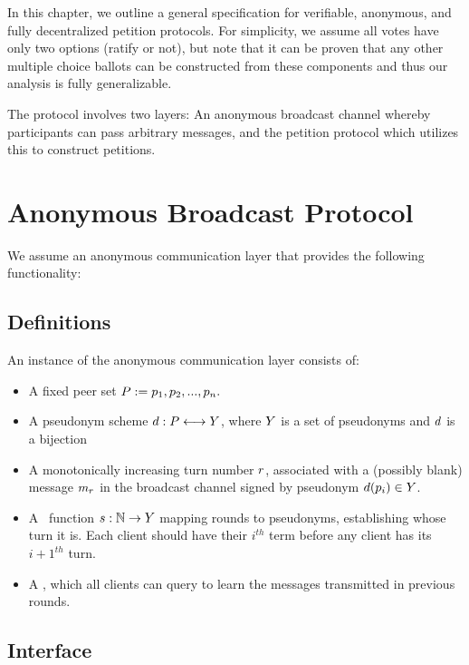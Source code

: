 In this chapter, we outline a general specification for verifiable, anonymous,
and fully decentralized petition protocols. For simplicity, we assume all votes
have only two options (ratify or not), but note that it can be proven that any
other multiple choice ballots can be constructed from these components and thus
our analysis is fully generalizable.

The protocol involves two layers: An anonymous broadcast channel whereby
participants can pass arbitrary messages, and the petition protocol which
utilizes this to construct petitions.
\section{Anonymous Broadcast Protocol}
\label{Section:AnonBcastP}
We assume an anonymous communication layer that provides the following
functionality:

\subsection{Definitions}
An instance of the anonymous communication layer consists of:
\begin{itemize}
\item A fixed peer set
  $P:=p_{1},p_{2},...,p_{n}.$
\item A pseudonym scheme $d:P\longleftrightarrow Y$,
  where $Y$ is a set of pseudonyms and $d$ is a bijection
\item A monotonically increasing turn number $r$, associated with a
  (possibly blank) message $m_{r}$ in the broadcast channel signed by
  pseudonym $d(p_{i})\in Y$.
\item A \KwSchedule~function $s:\mathbb{N}\to Y$ mapping
  rounds to pseudonyms, establishing whose turn it is. Each client should have
  their $i^{th}$ term before any client has its $i+1^{th}$ turn.
\item A \HistoryOracle, which all clients can query to learn the messages
  transmitted in previous rounds.
\end{itemize}

\subsection{Interface}

